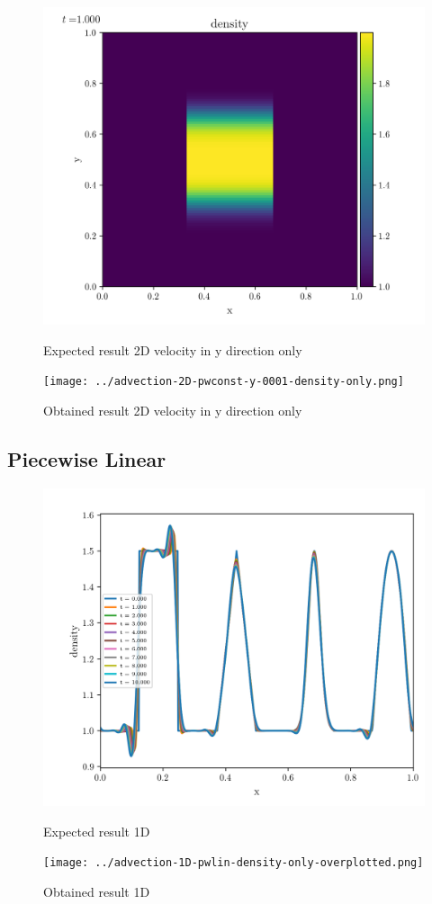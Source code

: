 \begin{figure}[htbp]
    \centering
	\includegraphics[width=.7\textwidth]{./figures/advection-2D-pwconst-y-0001-density-only.png}%
	\caption{Expected result 2D velocity in y direction only}
	\texttt{[image: ../advection-2D-pwconst-y-0001-density-only.png]}%
	\caption{Obtained result 2D velocity in y direction only}
\end{figure}






\clearpage
\subsection{Piecewise Linear}

\begin{figure}[htbp]
    \centering
	\includegraphics[width=.7\textwidth]{./figures/advection-1D-pwlin-density-only-overplotted.png}%
	\caption{Expected result 1D}
	\texttt{[image: ../advection-1D-pwlin-density-only-overplotted.png]}%
	\caption{Obtained result 1D}
\end{figure}

